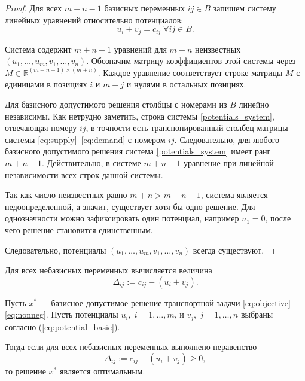 \documentclass[12pt]{article}
\theoremstyle{definition}
\theoremstyle{plain}
\theoremstyle{definition}
\begin{document}
\begin{proof}
Для всех $m+n-1$ базисных переменных $ij \in B$ запишем систему линейных уравнений
относительно потенциалов:
\begin{equation}\label{potentials_system}
u_i + v_j = c_{ij} \; \forall ij \in B.
\end{equation}

Система содержит $m+n-1$ уравнений для $m+n$ неизвестных $(u_1,\dots,u_m, v_1,\dots,v_n)$. 
Обозначим матрицу коэффициентов этой системы через $M \in \mathbb{R}^{(m+n-1) \times (m+n)}$. 
Каждое уравнение соответствует строке матрицы $M$ с единицами в позициях $i$ и $m+j$ и нулями в остальных позициях.

Для базисного допустимого решения столбцы с номерами из $B$ линейно независимы.
Как нетрудно заметить, строка системы \eqref{potentials_system}, отвечающая номеру $ij$,
в точности есть транспонированный столбец матрицы системы \eqref{eq:supply}--\eqref{eq:demand}
с номером $ij$. Следовательно, для любого базисного допустимого решения система
\eqref{potentials_system} имеет ранг $m + n - 1$. Действительно, в системе $m + n - 1$ уравнение
при линейной независимости всех строк данной системы.

Так как число неизвестных равно $m+n > m+n-1$, система является недоопределенной,
а значит, существует хотя бы одно решение. 
Для однозначности можно зафиксировать один потенциал, например $u_1 = 0$,
после чего решение становится единственным.

Следовательно, потенциалы $(u_1,\dots,u_m, v_1,\dots,v_n)$ всегда существуют.
\end{proof}

Для всех небазисных переменных вычисляется величина
\begin{equation}
\Delta_{ij} := c_{ij} - (u_i + v_j).
\label{eq:potential_nonbasic}
\end{equation}


\begin{assertionlocal}
Пусть $x^*$ — базисное допустимое решение транспортной задачи
\eqref{eq:objective}–\eqref{eq:nonneg}.
Пусть потенциалы $u_i,\; i=1,\dots,m$, и $v_j,\; j=1,\dots,n$ выбраны согласно (\ref{eq:potential_basic}).

Тогда если для всех небазисных переменных выполнено неравенство
\[
\Delta_{ij} := c_{ij} - (u_i + v_j) \ge 0,
\]
то решение $x^*$ является оптимальным.
\end{assertionlocal}
\end{document}
